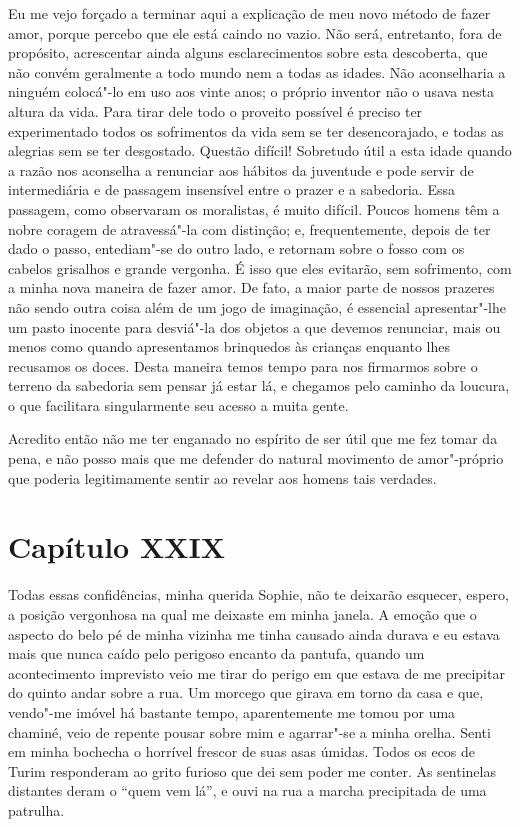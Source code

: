  Eu me vejo forçado a terminar aqui a explicação de meu novo método de
fazer amor, porque percebo que ele está caindo no vazio. Não será,
entretanto, fora de propósito, acrescentar ainda alguns esclarecimentos
sobre esta descoberta, que não convém geralmente a todo mundo nem a
todas as idades. Não aconselharia a ninguém colocá"-lo em uso aos vinte
anos; o próprio inventor não o usava nesta altura da vida. Para tirar
dele todo o proveito possível é preciso ter experimentado todos os
sofrimentos da vida sem se ter desencorajado, e todas as alegrias sem
se ter desgostado. Questão difícil! Sobretudo útil a esta idade quando
a razão nos aconselha a renunciar aos hábitos da juventude e pode
servir de intermediária e de passagem insensível entre o prazer e a
sabedoria. Essa passagem, como observaram os moralistas, é muito
difícil. Poucos homens têm a nobre coragem de atravessá"-la com
distinção; e, frequentemente, depois de ter dado o passo, entediam"-se
do outro lado, e retornam sobre o fosso com os cabelos grisalhos e
grande vergonha. É isso que eles evitarão, sem sofrimento, com a minha
nova maneira de fazer amor. De fato, a maior parte de nossos prazeres
não sendo outra coisa além de um jogo de imaginação, é essencial
apresentar"-lhe um pasto inocente para desviá"-la dos objetos a que
devemos renunciar, mais ou menos como quando apresentamos brinquedos às
crianças enquanto lhes recusamos os doces. Desta maneira temos tempo
para nos firmarmos sobre o terreno da sabedoria sem pensar já estar lá,
e chegamos pelo caminho da loucura, o que facilitara singularmente seu
acesso a muita gente. 

 Acredito então não me ter enganado no espírito de ser útil que me fez
tomar da pena, e não posso mais que me defender do natural movimento de                      
amor"-próprio que poderia legitimamente sentir ao revelar aos homens
tais verdades.

\section*{Capítulo XXIX}

 Todas essas confidências, minha querida Sophie, não te deixarão
esquecer, espero, a posição vergonhosa na qual me deixaste em minha
janela. A emoção que o aspecto do belo pé de minha vizinha me tinha
causado ainda durava e eu estava mais que nunca caído pelo perigoso
encanto da pantufa, quando um acontecimento imprevisto veio me tirar do
perigo em que estava de me precipitar do quinto andar sobre a rua. Um
morcego que girava em torno da casa e que, vendo"-me imóvel há bastante
tempo, aparentemente me tomou por uma chaminé, veio de repente pousar
sobre mim e agarrar"-se a minha orelha. Senti em minha bochecha o
horrível frescor de suas asas úmidas. Todos os ecos de Turim
responderam ao grito furioso que dei sem poder me conter. As sentinelas
distantes deram o ``quem vem lá'', e ouvi na rua a marcha precipitada de
uma patrulha.  

